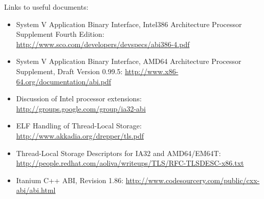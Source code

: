 Links to useful documents:
\begin{itemize}
 \item System V Application Binary Interface, Intel386{\texttrademark} Architecture
       Processor Supplement Fourth Edition:
       \url{http://www.sco.com/developers/devspecs/abi386-4.pdf}
 \item System V Application Binary Interface, AMD64 Architecture Processor
       Supplement, Draft Version 0.99.5:
       \url{http://www.x86-64.org/documentation/abi.pdf}
 \item Discussion of Intel processor extensions:
       \url{http://groups.google.com/group/ia32-abi}
 \item ELF Handling of Thread-Local Storage:
       \url{http://www.akkadia.org/drepper/tls.pdf}
 \item Thread-Local Storage Descriptors for IA32 and AMD64/EM64T:
       \url{http://people.redhat.com/aoliva/writeups/TLS/RFC-TLSDESC-x86.txt}
 \item Itanium C++ ABI, Revision 1.86:
       \url{http://www.codesourcery.com/public/cxx-abi/abi.html}
\end{itemize}

